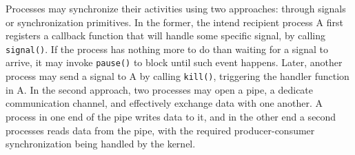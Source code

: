 \documentclass[10pt,a4paper]{article}
\begin{document}
Processes may synchronize their activities using two approaches: through signals or synchronization primitives. In the former, the intend recipient process A first registers a callback function that will handle some specific signal, by calling \texttt{signal()}. If the process has nothing more to do than waiting for a signal to arrive, it may invoke \texttt{pause()} to block until such event happens. Later, another process may send a signal to A by calling \texttt{kill()}, triggering the handler function in A. In the second approach, two processes may open a pipe, a dedicate communication channel, and effectively exchange data with one another. A process in one end of the pipe writes data to it, and in the other end a second processes reads data from the pipe, with the required producer-consumer synchronization being handled by the kernel.
\end{document}
